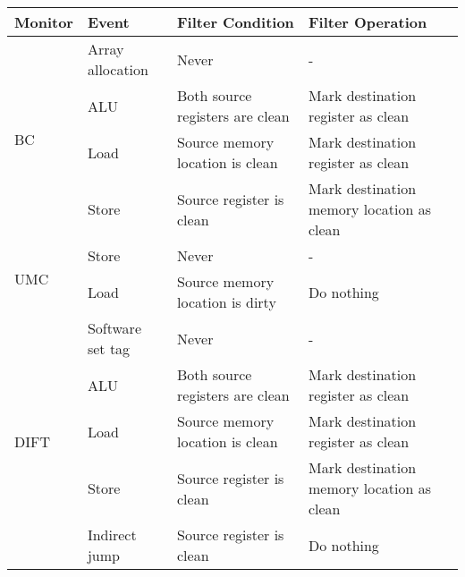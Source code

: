 

\begin{tabular}{|l|l|l|l|}
\hline

{\bf Monitor} & {\bf Event} & {\bf Filter Condition} & {\bf Filter Operation} \\ \hline \hline

\multirow{4}{*}{BC}  
& Array allocation & Never & - \\ \cline{2-4}
& ALU   & Both source registers are clean & Mark destination register as clean \\ \cline{2-4}
& Load  & Source memory location is clean & Mark destination register as clean \\ \cline{2-4}
& Store & Source register is clean & Mark destination memory location as clean \\
\hline\hline

\multirow{2}{*}{UMC}  
& Store & Never & - \\ \cline{2-4}
& Load & Source memory location is dirty & Do nothing \\ 
\hline\hline

\multirow{5}{*}{DIFT}  
& Software set tag & Never & - \\ \cline{2-4}
& ALU   & Both source registers are clean & Mark destination register as clean \\ \cline{2-4}
& Load  & Source memory location is clean & Mark destination register as clean \\ \cline{2-4}
& Store & Source register is clean & Mark destination memory location as clean \\ \cline{2-4}
& Indirect jump & Source register is clean & Do nothing \\ 
\hline


\end{tabular}
